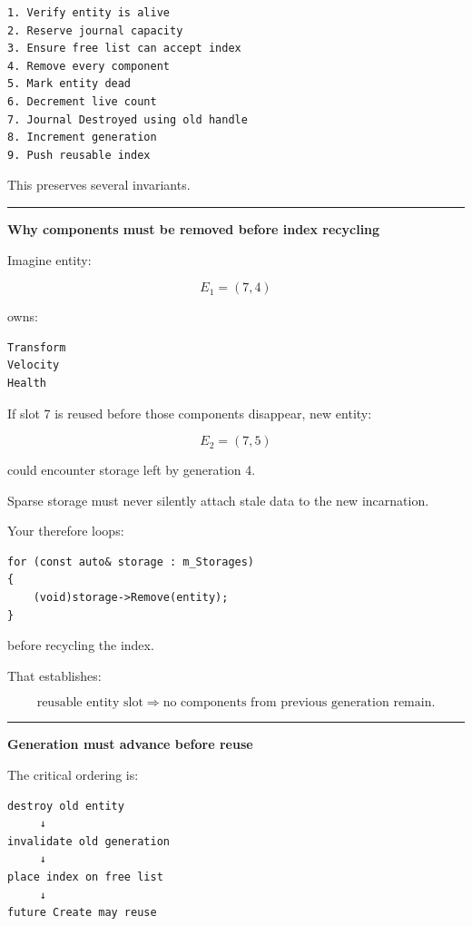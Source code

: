 \begin{verbatim}
1. Verify entity is alive
2. Reserve journal capacity
3. Ensure free list can accept index
4. Remove every component
5. Mark entity dead
6. Decrement live count
7. Journal Destroyed using old handle
8. Increment generation
9. Push reusable index
\end{verbatim}

This preserves several invariants.

\begin{center}\rule{0.5\linewidth}{0.5pt}\end{center}

\textbf{Why components must be removed before index recycling}

Imagine entity:

\[
E_1=(7,4)
\]

owns:

\begin{verbatim}
Transform
Velocity
Health
\end{verbatim}

If slot 7 is reused before those components disappear, new entity:

\[
E_2=(7,5)
\]

could encounter storage left by generation 4.

Sparse storage must never silently attach stale data to the new incarnation.

Your  therefore loops:

\begin{verbatim}
for (const auto& storage : m_Storages)
{
    (void)storage->Remove(entity);
}
\end{verbatim}

before recycling the index.

That establishes:

\[
\boxed{
\text{reusable entity slot}
\Rightarrow
\text{no components from previous generation remain}.
}
\]

\begin{center}\rule{0.5\linewidth}{0.5pt}\end{center}

\textbf{Generation must advance before reuse}

The critical ordering is:

\begin{verbatim}
destroy old entity
     ↓
invalidate old generation
     ↓
place index on free list
     ↓
future Create may reuse
\end{verbatim}

